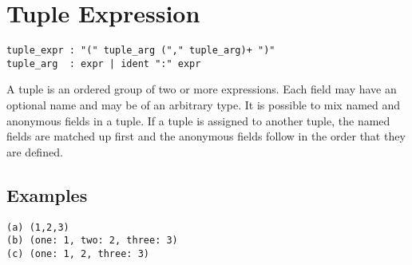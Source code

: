 \section{Tuple Expression}

\begin{verbatim}
tuple_expr : "(" tuple_arg ("," tuple_arg)+ ")"
tuple_arg  : expr | ident ":" expr
\end{verbatim}

A tuple is an ordered group of two or more expressions. Each field may have an
optional name and may be of an arbitrary type. It is possible to mix named and
anonymous fields in a tuple. If a tuple is assigned to another tuple, the named
fields are matched up first and the anonymous fields follow in the order that
they are defined.

\subsection{Examples}

\begin{verbatim}
(a) (1,2,3)
(b) (one: 1, two: 2, three: 3)
(c) (one: 1, 2, three: 3)
\end{verbatim}
